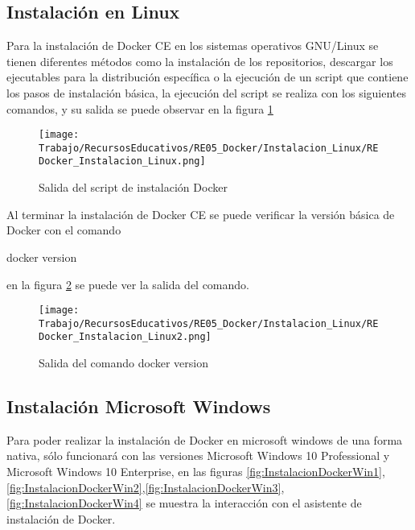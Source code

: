 \subsection{Instalación en Linux}
Para la instalación de Docker CE en los sistemas operativos GNU/Linux se tienen diferentes métodos como la instalación de los repositorios, descargar los ejecutables para la distribución específica o la ejecución de un script que contiene los pasos de instalación básica, la ejecución del script se realiza con los siguientes comandos, y su salida se puede observar en la figura \ref{fig:InstalacionDockerLinux1}

\begin{figure}[!hbtp]
	\centering
	\texttt{[image: Trabajo/RecursosEducativos/RE05\_Docker/Instalacion\_Linux/REDocker\_Instalacion\_Linux.png]}
	\vspace{-0.2cm}
	\caption{Salida del script de instalación Docker}
	\label{fig:InstalacionDockerLinux1}
\end{figure}

Al terminar la instalación de Docker CE se puede verificar la versión básica de Docker con el comando \begin{commandshell}{docker version}\end{commandshell}
en la figura \ref{fig:InstalacionDockerLinux2} se puede ver la salida del comando.

\begin{figure}[!hbtp]
	\centering
	\texttt{[image: Trabajo/RecursosEducativos/RE05\_Docker/Instalacion\_Linux/REDocker\_Instalacion\_Linux2.png]}
	\vspace{-0.2cm}
	\caption{Salida del comando docker version }
	\label{fig:InstalacionDockerLinux2}
\end{figure}
\subsection{Instalación Microsoft Windows}
Para poder realizar la instalación de Docker en microsoft windows de una forma nativa, sólo funcionará con las versiones Microsoft Windows 10 Professional y Microsoft Windows 10 Enterprise, en las figuras \ref{fig:InstalacionDockerWin1},\ref{fig:InstalacionDockerWin2},\ref{fig:InstalacionDockerWin3},\ref{fig:InstalacionDockerWin4} se muestra la interacción con el asistente de instalación de Docker.

